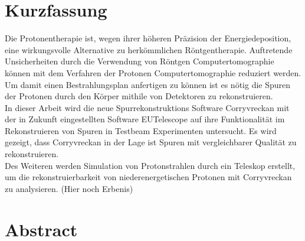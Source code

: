 \thispagestyle{plain}

\section*{Kurzfassung}
Die Protonentherapie ist, wegen ihrer höheren Präzision der Energiedeposition, eine wirkungsvolle Alternative zu herkömmlichen Röntgentherapie.
Auftretende Unsicherheiten durch die Verwendung von Röntgen Computertomographie können mit dem Verfahren der Protonen Computertomographie reduziert werden.
Um damit einen Bestrahlungsplan anfertigen zu können ist es nötig die Spuren der Protonen durch den Körper mithile von Detektoren zu rekonstruieren. \\
In dieser Arbeit wird die neue Spurrekonstruktions Software Corryvreckan mit der in Zukunft eingestellten Software EUTelescope auf ihre Funktionalität im
Rekonstruieren von Spuren in Testbeam Experimenten untersucht. Es wird gezeigt, dass Corryvreckan in der Lage ist Spuren mit vergleichbarer Qualität zu rekonstruieren.\\
Des Weiteren werden Simulation von Protonstrahlen durch ein Teleskop erstellt, um die rekonstruierbarkeit von niederenergetischen Protonen
mit Corryvreckan zu analysieren. (Hier noch Erbenis)

\section*{Abstract}
\begin{english}




\end{english}
